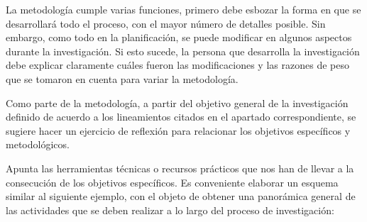 \documentclass[10pt,a4paper]{protocol}
\begin{document}
La metodología cumple varias funciones,  primero debe esbozar la forma en que se desarrollará todo el proceso, con el mayor número de detalles posible. Sin embargo, como todo en la planificación,  se puede modificar en algunos aspectos durante la investigación. Si esto sucede, la persona que desarrolla la investigación debe explicar claramente cuáles fueron las modificaciones y las razones de peso que se tomaron en cuenta para variar la metodología. \\ \vspace*{0.5cm}

Como parte de la metodología, a partir del objetivo general de la investigación definido de acuerdo a los lineamientos citados en el apartado correspondiente, se sugiere hacer un ejercicio de reflexión para relacionar los objetivos específicos y metodológicos.\\ \vspace*{0.5cm}

Apunta las herramientas técnicas o recursos prácticos que nos han de llevar a la consecución de los objetivos específicos.
Es conveniente elaborar un esquema similar al siguiente ejemplo, con el objeto de obtener una panorámica general de las actividades que se deben realizar a lo largo del proceso de investigación:





\printbibliography


\divider


\end{document}
